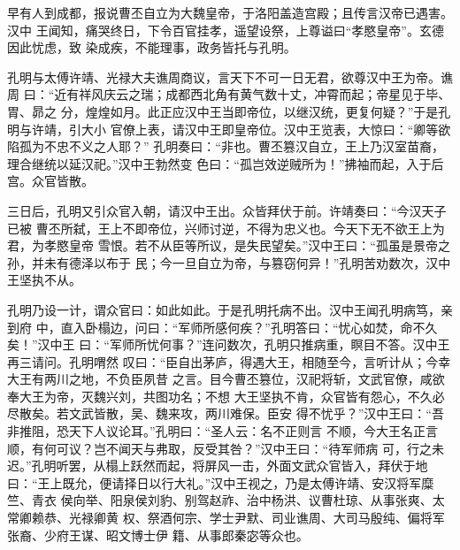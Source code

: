 早有人到成都，报说曹丕自立为大魏皇帝，于洛阳盖造宫殿；且传言汉帝已遇害。汉中
王闻知，痛哭终日，下令百官挂孝，遥望设祭，上尊谥曰“孝愍皇帝”。玄德因此忧虑，致
染成疾，不能理事，政务皆托与孔明。

孔明与太傅许靖、光禄大夫谯周商议，言天下不可一日无君，欲尊汉中王为帝。谯周
曰：“近有祥风庆云之瑞；成都西北角有黄气数十丈，冲霄而起；帝星见于毕、胃、昴之
分，煌煌如月。此正应汉中王当即帝位，以继汉统，更复何疑？”于是孔明与许靖，引大小
官僚上表，请汉中王即皇帝位。汉中王览表，大惊曰：“卿等欲陷孤为不忠不义之人耶？”
孔明奏曰：“非也。曹丕篡汉自立，王上乃汉室苗裔，理合继统以延汉祀。”汉中王勃然变
色曰：“孤岂效逆贼所为！”拂袖而起，入于后宫。众官皆散。

三日后，孔明又引众官入朝，请汉中王出。众皆拜伏于前。许靖奏曰：“今汉天子已被
曹丕所弑，王上不即帝位，兴师讨逆，不得为忠义也。今天下无不欲王上为君，为孝愍皇帝
雪恨。若不从臣等所议，是失民望矣。”汉中王曰：“孤虽是景帝之孙，并未有德泽以布于
民；今一旦自立为帝，与篡窃何异！”孔明苦劝数次，汉中王坚执不从。

孔明乃设一计，谓众官曰：如此如此。于是孔明托病不出。汉中王闻孔明病笃，亲到府
中，直入卧榻边，问曰：“军师所感何疾？”孔明答曰：“忧心如焚，命不久矣！”汉中王
曰：“军师所忧何事？”连问数次，孔明只推病重，瞑目不答。汉中王再三请问。孔明喟然
叹曰：“臣自出茅庐，得遇大王，相随至今，言听计从；今幸大王有两川之地，不负臣夙昔
之言。目今曹丕篡位，汉祀将斩，文武官僚，咸欲奉大王为帝，灭魏兴刘，共图功名；不想
大王坚执不肯，众官皆有怨心，不久必尽散矣。若文武皆散，吴、魏来攻，两川难保。臣安
得不忧乎？”汉中王曰：“吾非推阻，恐天下人议论耳。”孔明曰：“圣人云：名不正则言
不顺，今大王名正言顺，有何可议？岂不闻天与弗取，反受其咎？”汉中王曰：“待军师病
可，行之未迟。”孔明听罢，从榻上跃然而起，将屏风一击，外面文武众官皆入，拜伏于地
曰：“王上既允，便请择日以行大礼。”汉中王视之，乃是太傅许靖、安汉将军糜竺、青衣
侯向举、阳泉侯刘豹、别驾赵祚、治中杨洪、议曹杜琼、从事张爽、太常卿赖恭、光禄卿黄
权、祭酒何宗、学士尹默、司业谯周、大司马殷纯、偏将军张裔、少府王谋、昭文博士伊
籍、从事郎秦宓等众也。

